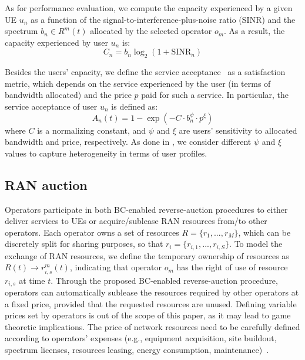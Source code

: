 \documentclass[conference]{IEEEtran}
\theoremstyle{definition}
\begin{document}
As for performance evaluation, we compute the capacity experienced by a given UE $u_n$ as a function of the signal-to-interference-plus-noise ratio (SINR) and the spectrum $b_n \in R^m(t)$ allocated by the selected operator $o_m$. As a result, the capacity experienced by user $u_n$ is:
\begin{equation}
    C_n = b_n \log_2(1 + \text{SINR}_n)
\end{equation}

Besides the users' capacity, we define the service acceptance~\cite{giupponi2009fuzzy} as a satisfaction metric, which depends on the service experienced by the user (in terms of bandwidth allocated) and the price $p$ paid for such a service. In particular, the service acceptance of user $u_n$ is defined as:
\begin{equation}
    A_n(t) = 1-\exp{(-C \cdot b_{n}^{\psi} \cdot p^\xi)}
    \label{eq:acceptance}
\end{equation}
where $C$ is a normalizing constant, and $\psi$ and $\xi$ are users' sensitivity to allocated bandwidth and price, respectively. As done in \cite{giupponi2009fuzzy}, we consider different $\psi$ and $\xi$ values to capture heterogeneity in terms of user profiles. %

\subsection{RAN auction}
Operators participate in both BC-enabled reverse-auction procedures to either deliver services to UEs or acquire/sublease RAN resources from/to other operators. Each operator owns a set of resources $R = \{r_{1},...,r_{M}\}$, which can be discretely split for sharing purposes, so that $r_i = \{r_{i,1},...,r_{i,S}\}$. To model the exchange of RAN resources, we define the temporary ownership of resources as $R(t) \rightarrow r_{i,s}^m(t)$, indicating that operator $o_m$ has the right of use of resource $r_{i,s}$ at time $t$. 
Through the proposed BC-enabled reverse-auction procedure, operators can automatically sublease the resources required by other operators at a fixed price, provided that the requested resources are unused. Defining variable prices set by operators is out of the scope of this paper, as it may lead to game theoretic implications. The price of network resources need to be carefully defined according to operators' expenses (e.g., equipment acquisition, site buildout, spectrum licenses, resources leasing, energy consumption, maintenance)~\cite{wisely2018capacity}.%
\end{document}
